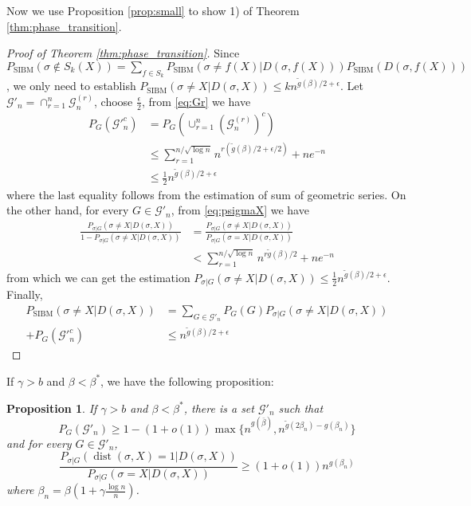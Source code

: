 \documentclass[journal]{IEEEtran}
\newtheorem{proposition}{Proposition}
\newcommand{\cG}{\mathcal{G}}
\newcommand{\1}{\mathbbm{1}}
\DeclareMathOperator{\SIBM}{SIBM}
\DeclareMathOperator{\dist}{dist}
\begin{document}
Now we use Proposition \ref{prop:small} to show 1) of Theorem \ref{thm:phase_transition}.
\begin{proof}[Proof of Theorem \ref{thm:phase_transition}]
Since $P_{\SIBM}(\sigma \not \in S_k(X)) = \sum_{f\in S_k} P_{\SIBM}(\sigma \neq f(X) | D(\sigma, f(X))) P_{\SIBM}(D(\sigma, f(X)))$,
we only need to establish $P_{\SIBM}(\sigma \neq X | D(\sigma, X)) \leq k n^{\tilde{g}(\beta)/2 + \epsilon}$.
Let $\cG'_n = \cap_{r=1}^n \cG_n^{(r)}$, choose $\frac{\epsilon}{2}$, from \eqref{eq:Gr} we have
\begin{align*}
P_G(\cG'^c_n) &= P_G(\cup_{r=1}^n (\cG_n^{(r)})^c) \\
&\leq \sum_{r=1}^{n/\sqrt{\log n } } n^{r(\tilde{g}(\beta)/2 + \epsilon/2)}  + n e^{-n} \\
& \leq \frac{1}{2} n^{\tilde{g}(\beta)/2 + \epsilon}
\end{align*}
where the last equality follows from the estimation of sum of geometric series.
On the other hand, for every $G \in \cG'_n$, from \eqref{eq:psigmaX}
we have
\begin{align*}
\frac{P_{\sigma | G}(\sigma \neq X | D(\sigma, X))}{1-P_{\sigma | G}(\sigma \neq X | D(\sigma, X))} &= \frac{P_{\sigma | G}(\sigma \neq X | D(\sigma, X))}{P_{\sigma|G}(\sigma=X | D(\sigma, X))} \\
&< \sum_{r=1}^{n/\sqrt{\log n }}  n^{r\tilde{g}(\beta)/2} + n e^{-n}
\end{align*}
from which we can get the estimation $P_{\sigma | G}(\sigma \neq X | D(\sigma, X))\leq \frac{1}{2}n^{\tilde{g}(\beta)/2 + \epsilon}$.
Finally, 
\begin{align*}
P_{\SIBM}(\sigma \neq X|D(\sigma, X)) &= \sum_{G\in \cG'_n} P_G(G)P_{\sigma |G}(\sigma \neq X | D(\sigma, X)) \\
+ P_G(\cG'^c_n)
& \leq n^{\tilde{g}(\beta)/2 + \epsilon}
\end{align*}

\end{proof}
If $\gamma > b$ and $\beta < \beta^*$, we have the following proposition:
\begin{proposition}\label{prop:large2}
	If $\gamma > b$ and $\beta < \beta^*$, there is a set $\cG'_n$ such that
	\begin{equation}
	P_G(\cG'_n) \geq 1 - (1+o(1))\max\{n^{g(\bar{\beta})}, n^{\tilde{g}(2\beta_n) - g(\beta_n)} \}
	\end{equation}
	and for every $G \in \cG'_n$,
	\begin{equation}\label{eq:diff1g}
	\frac{P_{\sigma|G}(\dist(\sigma, X)=1 | D(\sigma, X))}
	{P_{\sigma|G}(\sigma=X | D(\sigma, X))} \geq (1+o(1))n^{g(\beta_n)}
	\end{equation}
	where $\beta_n = \beta(1+\gamma\frac{\log n}{n})$.
\end{proposition}
\end{document}
